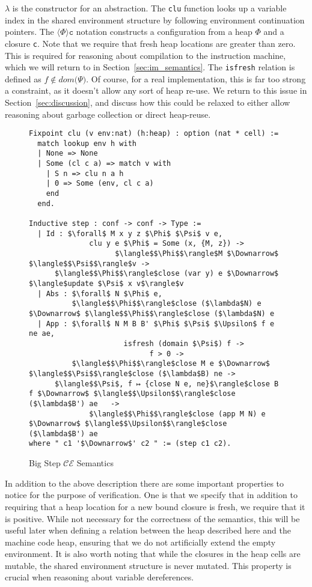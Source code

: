 $\lambda$ is the constructor for an abstraction. The \texttt{clu} function looks
up a variable index in the shared environment structure by following environment
continuation pointers. The $\langle \Phi \rangle \texttt{c}$ notation constructs
a configuration from a heap $\Phi$ and a closure \texttt{c}. Note that we
require that fresh heap locations are greater than zero. This is required for
reasoning about compilation to the instruction machine, which we will return to
in Section~\ref{sec:im_semantics}. The \texttt{isfresh} relation is defined as
$f \notin dom \big( \Psi \big)$. Of course, for a real implementation, this is
far too strong a constraint, as it doesn't allow any sort of heap re-use. We
return to this issue in Section~\ref{sec:discussion}, and discuss how this could
be relaxed to either allow reasoning about garbage collection or direct
heap-reuse.

\begin{figure}
\begin{lstlisting}
Fixpoint clu (v env:nat) (h:heap) : option (nat * cell) := 
  match lookup env h with
  | None => None
  | Some (cl c a) => match v with
    | S n => clu n a h
    | 0 => Some (env, cl c a)
    end
  end.

Inductive step : conf -> conf -> Type :=
  | Id : $\forall$ M x y z $\Phi$ $\Psi$ v e, 
              clu y e $\Phi$ = Some (x, {M, z}) -> 
                    $\langle$$\Phi$$\rangle$M $\Downarrow$ $\langle$$\Psi$$\rangle$v ->
      $\langle$$\Phi$$\rangle$close (var y) e $\Downarrow$ $\langle$update $\Psi$ x v$\rangle$v
  | Abs : $\forall$ N $\Phi$ e, 
          $\langle$$\Phi$$\rangle$close ($\lambda$N) e $\Downarrow$ $\langle$$\Phi$$\rangle$close ($\lambda$N) e
  | App : $\forall$ N M B B' $\Phi$ $\Psi$ $\Upsilon$ f e ne ae, 
                      isfresh (domain $\Psi$) f -> 
                            f > 0 ->
          $\langle$$\Phi$$\rangle$close M e $\Downarrow$ $\langle$$\Psi$$\rangle$close ($\lambda$B) ne -> 
      $\langle$$\Psi$, f ↦ {close N e, ne}$\rangle$close B f $\Downarrow$ $\langle$$\Upsilon$$\rangle$close ($\lambda$B') ae   ->
              $\langle$$\Phi$$\rangle$close (app M N) e $\Downarrow$ $\langle$$\Upsilon$$\rangle$close ($\lambda$B') ae
where " c1 '$\Downarrow$' c2 " := (step c1 c2).
\end{lstlisting}
\caption{Big Step $\mathcal{CE}$ Semantics}
\label{fig:bigstep}
\end{figure}

In addition to the above description there are some important properties to
notice for the purpose of verification. One is that we specify that in addition
to requiring that a heap location for a new bound closure is fresh, we require
that it is positive. While not necessary for the correctness of the
semantics, this will be useful later when defining a relation between the heap
described here and the machine code heap, ensuring that we do not artificially
extend the empty environment. It is also worth noting that while the closures in
the heap cells are mutable, the shared environment structure is never mutated.
This property is crucial when reasoning about variable dereferences. 

